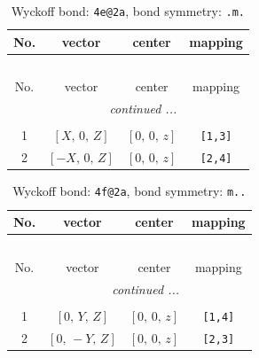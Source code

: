 \documentclass[fleqn,8pt]{jsarticle}
\begin{document}
\begin{longtable}{cccc}
\caption{Wyckoff bond: {\tt 4e@2a}, bond symmetry: {\tt .m.}}
 \\
 \hline \hline
No. & vector & center & mapping \\ \hline \endfirsthead

\multicolumn{3}{l}{\tablename\ \thetable{}} \\
 \hline \hline
No. & vector & center & mapping \\ \hline \endhead

 \hline \hline
\multicolumn{3}{r}{\footnotesize\it continued ...} \\ \endfoot

 \hline \hline
\multicolumn{3}{r}{} \\ \endlastfoot

1 & $\left[ X,\, 0,\, Z \right]$ & $\left[ 0,\, 0,\, z \right]$ & {\tt [1,3]} \\ \hline
2 & $\left[ - X,\, 0,\, Z \right]$ & $\left[ 0,\, 0,\, z \right]$ & {\tt [2,4]} \\
\end{longtable}
\renewcommand{\arraystretch}{1.2}
\begin{longtable}{cccc}
\caption{Wyckoff bond: {\tt 4f@2a}, bond symmetry: {\tt m..}}
 \\
 \hline \hline
No. & vector & center & mapping \\ \hline \endfirsthead

\multicolumn{3}{l}{\tablename\ \thetable{}} \\
 \hline \hline
No. & vector & center & mapping \\ \hline \endhead

 \hline \hline
\multicolumn{3}{r}{\footnotesize\it continued ...} \\ \endfoot

 \hline \hline
\multicolumn{3}{r}{} \\ \endlastfoot

1 & $\left[ 0,\, Y,\, Z \right]$ & $\left[ 0,\, 0,\, z \right]$ & {\tt [1,4]} \\ \hline
2 & $\left[ 0,\, - Y,\, Z \right]$ & $\left[ 0,\, 0,\, z \right]$ & {\tt [2,3]} \\
\end{longtable}
\renewcommand{\arraystretch}{1.2}
\end{document}

